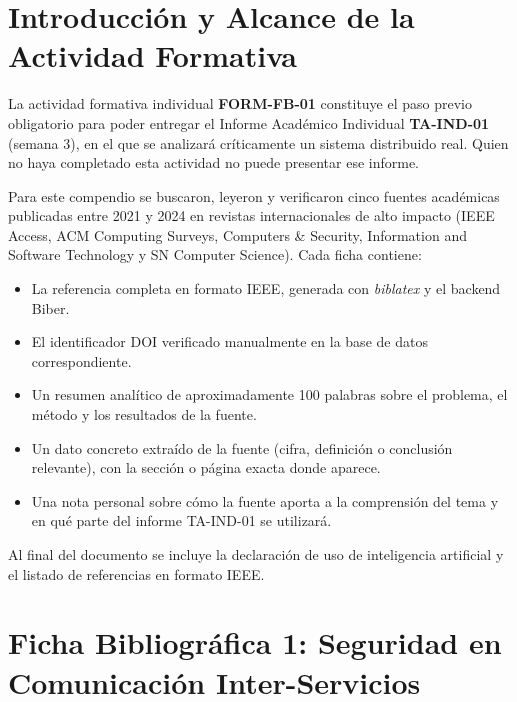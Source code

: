 \documentclass[11pt,a4paper]{article}
\begin{document}
\vspace{0.4em}

\section{Introducción y Alcance de la Actividad Formativa}

La actividad formativa individual \textbf{FORM-FB-01} constituye el paso previo obligatorio para poder entregar el Informe Académico Individual \textbf{TA-IND-01} (semana 3), en el que se analizará críticamente un sistema distribuido real. Quien no haya completado esta actividad no puede presentar ese informe.

Para este compendio se buscaron, leyeron y verificaron cinco fuentes académicas publicadas entre 2021 y 2024 en revistas internacionales de alto impacto (IEEE Access, ACM Computing Surveys, Computers \& Security, Information and Software Technology y SN Computer Science). Cada ficha contiene:

\begin{itemize}
  \item La referencia completa en formato IEEE, generada con \emph{biblatex} y el backend Biber.
  \item El identificador DOI verificado manualmente en la base de datos correspondiente.
  \item Un resumen analítico de aproximadamente 100 palabras sobre el problema, el método y los resultados de la fuente.
  \item Un dato concreto extraído de la fuente (cifra, definición o conclusión relevante), con la sección o página exacta donde aparece.
  \item Una nota personal sobre cómo la fuente aporta a la comprensión del tema y en qué parte del informe TA-IND-01 se utilizará.
\end{itemize}

Al  final del documento se incluye la declaración de uso de inteligencia artificial y el listado de referencias en formato IEEE.

\newpage

\section{Ficha Bibliográfica 1: Seguridad en Comunicación Inter-Servicios}
\end{document}
